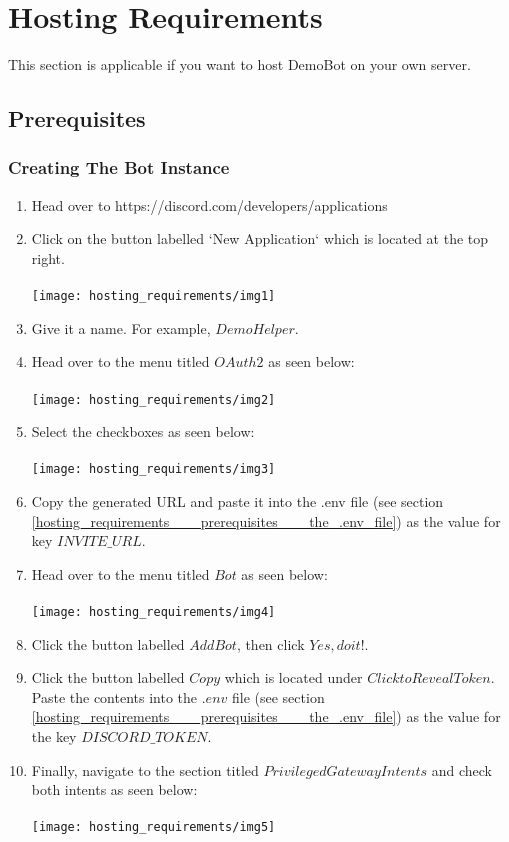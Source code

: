 
\section{Hosting Requirements}
This section is applicable if you want to host DemoBot on your own server.

\subsection{Prerequisites}

\subsubsection{Creating The Bot Instance}
\begin{enumerate}

	\item{
		Head over to https://discord.com/developers/applications
	}
	\item{
		Click on the button labelled `New Application` which is located at the top right.\\\\
		\texttt{[image: hosting\_requirements/img1]}
	}
	\item{
		Give it a name.
		For example, $Demo Helper$.
	}
	\item{
		Head over to the menu titled $OAuth2$ as seen below:\\\\
		\texttt{[image: hosting\_requirements/img2]}
	}
	\item{
		Select the checkboxes as seen below:\\\\
		\texttt{[image: hosting\_requirements/img3]}
	}
	\item{
		Copy the generated URL and paste it into the .env file (see section \ref{hosting_requirements___prerequisites___the_.env_file}) as the value for key $INVITE\_URL$.
	}
	\item{
		Head over to the menu titled $Bot$ as seen below:\\\\
		\texttt{[image: hosting\_requirements/img4]}
	}
	\item{
		Click the button labelled $Add Bot$, then click $Yes, do it!$.
	}
	\item{
		Click the button labelled $Copy$ which is located under $Click to Reveal Token$.
		Paste the contents into the $.env$ file (see section \ref{hosting_requirements___prerequisites___the_.env_file}) as the value for the key $DISCORD\_TOKEN$.
	}
	\item{
		Finally, navigate to the section titled $Privileged Gateway Intents$ and check both intents as seen below:\\\\
		\texttt{[image: hosting\_requirements/img5]}
	}

\end{enumerate}

